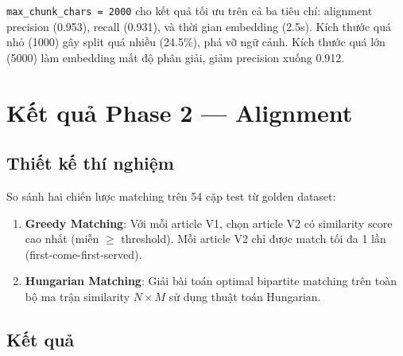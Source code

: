 \texttt{max\_chunk\_chars = 2000} cho kết quả tối ưu trên cả ba tiêu chí: alignment precision (0.953), recall (0.931), và thời gian embedding (2.5s). Kích thước quá nhỏ (1000) gây split quá nhiều (24.5\%), phá vỡ ngữ cảnh. Kích thước quá lớn (5000) làm embedding mất độ phân giải, giảm precision xuống 0.912.

\section{Kết quả Phase 2 — Alignment}

\subsection{Thiết kế thí nghiệm}

So sánh hai chiến lược matching trên 54 cặp test từ golden dataset:

\begin{enumerate}[label=(\arabic*)]
    \item \textbf{Greedy Matching}: Với mỗi article V1, chọn article V2 có similarity score cao nhất (miễn $\geq$ threshold). Mỗi article V2 chỉ được match tối đa 1 lần (first-come-first-served).
    \item \textbf{Hungarian Matching}: Giải bài toán optimal bipartite matching trên toàn bộ ma trận similarity $N \times M$ sử dụng thuật toán Hungarian.
\end{enumerate}

\subsection{Kết quả}

